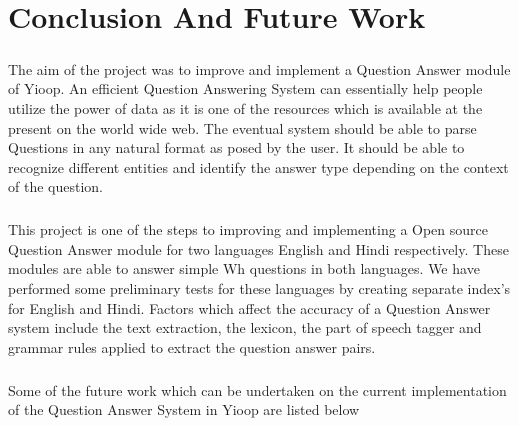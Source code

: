 \chapter{Conclusion And Future Work}

\paragraph{}
The aim of the project was to improve and implement a Question Answer module of Yioop. An efficient Question Answering System can essentially help people utilize the power of data as it is one of the resources which is available at the present on the world wide web. The eventual system should be able to parse Questions in any natural format as posed by the user. It should be able to recognize different entities and identify the answer type depending on the context of the question.

\paragraph{}
This project is one of the steps to improving and implementing a Open source Question Answer module for two languages English and Hindi respectively. These modules are able to answer simple Wh questions in both languages. We have performed some preliminary tests for these languages by creating separate index's for English and Hindi. Factors which affect the accuracy of a Question Answer system include the text extraction,  the lexicon, the part of speech tagger and grammar rules applied to extract the question answer pairs.

\paragraph{}
Some of the future work which can be undertaken on the current implementation of the Question Answer System in Yioop are listed below

